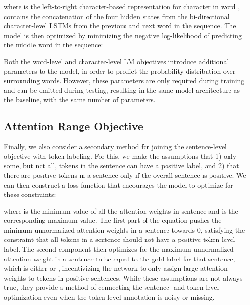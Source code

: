 \documentclass[letterpaper]{article} \usepackage{aaai19}  \usepackage{times}  \usepackage{helvet}  \usepackage{courier}  \usepackage{graphicx}
\begin{document}
\noindent where  is the left-to-right character-based representation for character  in word ,  contains the concatenation of the four hidden states from the bi-directional character-level LSTMs from the previous and next word in the sequence. The model is then optimized by minimizing the negative log-likelihood of predicting the middle word in the sequence:


Both the word-level and character-level LM objectives introduce additional parameters to the model, in order to predict the probability distribution over surrounding words. However, these parameters are only required during training and can be omitted during testing, resulting in the same model architecture as the baseline, with the same number of parameters.

\subsection{Attention Range Objective}

Finally, we also consider a secondary method for joining the sentence-level objective with token labeling. 
For this, we make the assumptions that 1) only some, but not all, tokens in the sentence can have a positive label, and 2) that there are positive tokens in a sentence only if the overall sentence is positive.
We can then construct a loss function that encourages the model to optimize for these constraints:


\noindent where  is the minimum value of all the attention weights in sentence  and  is the corresponding maximum value.
The first part of the equation pushes the minimum unnormalized attention weights in a sentence towards 0, satisfying the constraint that all tokens in a sentence should not have a positive token-level label.
The second component then optimizes for the maximum unnormalized attention weight in a sentence to be equal to the gold label for that sentence, which is either  or , incentivizing the network to only assign large attention weights to tokens in positive sentences.
While these assumptions are not always true, they provide a method of connecting the sentence- and token-level optimization even when the token-level annotation is noisy or missing.
\end{document}
